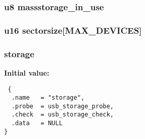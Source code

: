 \subsubsection{\setlength{\rightskip}{0pt plus 5cm}u8 {\bf massstorage\_\-in\_\-use}}\label{storage_8c_8ce1f15d6f9717645330318ee1023230}


\subsubsection{\setlength{\rightskip}{0pt plus 5cm}u16 {\bf sectorsize}[MAX\_\-DEVICES]}\label{storage_8c_4b83b9e724e643b04dadfa22ba4a94ae}


\subsubsection{ {\bf storage}}\label{storage_8c_43d5f58db83c9692fb088be7d46f764b}


\textbf{Initial value:}

\begin{Code}\begin{verbatim} {
  .name   = "storage",
  .probe  = usb_storage_probe,
  .check  = usb_storage_check,
  .data   = NULL
}
\end{verbatim}\end{Code}
